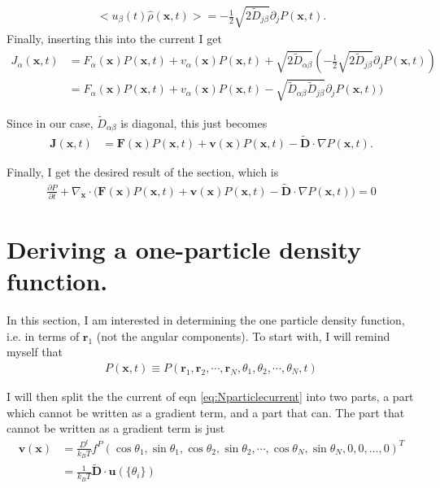 \documentclass{article}
\begin{document}
\begin{align}
  <u_{\beta}(t)\hat{\rho}(\bm{x},t)>=-\frac{1}{2}\sqrt{2\tilde{D}_{j\beta}}
  \partial_jP(\bm{x},t).
\end{align}
Finally, inserting this into the current I get
\begin{align}
  J_{\alpha}(\bm{x},t)&=F_{\alpha}(\bm{x})P(\bm{x},t)+v_{\alpha}(\bm{x})P(\bm{x},t)
                        +\sqrt{2\tilde{D}_{\alpha\beta}}(-\frac{1}{2}\sqrt{2\tilde{D}_{j\beta}}
                        \partial_jP(\bm{x},t))\nonumber\\
                      &=F_{\alpha}(\bm{x})P(\bm{x},t)+v_{\alpha}(\bm{x})P(\bm{x},t)
                        -\sqrt{\tilde{D}_{\alpha\beta}\tilde{D}_{j\beta}}
                        \partial_jP(\bm{x},t))
\end{align}

Since in our case, $\tilde{D}_{\alpha\beta}$ is diagonal, this just becomes
\begin{align}\label{eq:Nparticlecurrent}
  \bm{J}(\bm{x},t)&=\bm{F}(\bm{x})P(\bm{x},t)+\bm{v}(\bm{x})P(\bm{x},t)
                    -\bm{\tilde{D}}\cdot\nabla P(\bm{x},t).
\end{align}

Finally, I get the desired result of the section, which is
\begin{align}\label{eq:NparticleFP}
  \frac{\partial P}{\partial t} + \nabla_{\bm{x}}\cdot\big(\bm{F}(\bm{x})P(\bm{x},t)
  +\bm{v}(\bm{x})P(\bm{x},t)-\bm{\tilde{D}}\cdot\nabla P(\bm{x},t)\big)=0
\end{align}


\section{Deriving a one-particle density function.}

In this section, I am interested in determining the one particle density function, i.e. in
terms of $\bm{r}_1$ (not the angular components). To start with, I will remind myself that
\begin{align}
  P(\bm{x},t)\equiv P(\bm{r}_1,\bm{r}_2,\cdots,\bm{r}_N,\theta_1,\theta_2,\cdots,\theta_N,t)
\end{align}

I will then split the the current of eqn \ref{eq:Nparticlecurrent} into two parts, a part which
cannot be written as a gradient term, and a part that can. The part that cannot be written as
a gradient term is just
\begin{align}\label{eq:dissipative_force}
  \bm{v}(\bm{x})&=\frac{D^t}{k_BT}f^P(\cos\theta_1,\sin\theta_1,\cos\theta_2,
                  \sin\theta_2,\cdots,\cos\theta_N,\sin\theta_N,0,0,\dots,0)^T\nonumber\\
                &=\frac{1}{k_BT}\bm{\tilde{D}}\cdot \bm{u}(\{\theta_i\})
\end{align}
\end{document}
